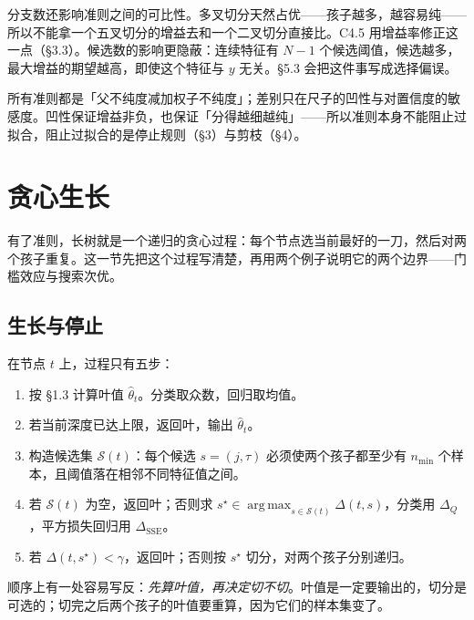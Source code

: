 \documentclass[11pt,a4paper,fontset=windows,zihao=-4]{ctexart}
\DeclareMathOperator*{\argmax}{arg\,max}
\DeclareMathOperator{\SSE}{SSE}
\newcommand{\Scal}{\mathcal{S}}
\begin{document}
分支数还影响准则之间的可比性。多叉切分天然占优——孩子越多，越容易纯——所以不能拿一个五叉切分的增益去和一个二叉切分直接比。C4.5 用增益率修正这一点（§3.3）。候选数的影响更隐蔽：连续特征有 $N-1$ 个候选阈值，候选越多，最大增益的期望越高，即使这个特征与 $y$ 无关。§5.3 会把这件事写成选择偏误。

\begin{keybox}
所有准则都是「父不纯度减加权子不纯度」；差别只在尺子的凹性与对置信度的敏感度。凹性保证增益非负，也保证「分得越细越纯」——所以准则本身不能阻止过拟合，阻止过拟合的是停止规则（§3）与剪枝（§4）。
\end{keybox}


\section{贪心生长}

有了准则，长树就是一个递归的贪心过程：每个节点选当前最好的一刀，然后对两个孩子重复。这一节先把这个过程写清楚，再用两个例子说明它的两个边界——门槛效应与搜索次优。

\subsection{生长与停止}

在节点 $t$ 上，过程只有五步：

\begin{enumerate}[label=\textcolor{navy}{\bfseries S\arabic*.},leftmargin=2.6em,itemsep=0.45em]
  \item 按 §1.3 计算叶值 $\widehat\theta_t$。分类取众数，回归取均值。
  \item 若当前深度已达上限，返回叶，输出 $\widehat\theta_t$。
  \item 构造候选集 $\Scal(t)$：每个候选 $s=(j,\tau)$ 必须使两个孩子都至少有 $n_{\min}$ 个样本，且阈值落在相邻不同特征值之间。
  \item 若 $\Scal(t)$ 为空，返回叶；否则求 $s^\star\in\argmax_{s\in\Scal(t)}\Delta(t,s)$，分类用 $\Delta_Q$，平方损失回归用 $\Delta_{\SSE}$。
  \item 若 $\Delta(t,s^\star)<\gamma$，返回叶；否则按 $s^\star$ 切分，对两个孩子分别递归。
\end{enumerate}

顺序上有一处容易写反：\emph{先算叶值，再决定切不切}。叶值是一定要输出的，切分是可选的；切完之后两个孩子的叶值要重算，因为它们的样本集变了。
\end{document}
